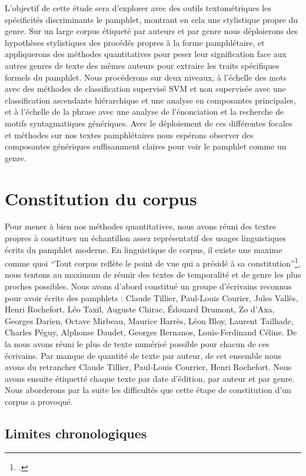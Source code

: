 L'objectif de cette étude sera d'explorer avec des outils textométriques les spécificités discriminants le pamphlet, montrant en cela une stylistique propre du genre. Sur un large corpus étiqueté par auteurs et par genre nous déploierons des hypothèses stylistiques des procédés propres à la forme pamphlétaire, et appliquerons des méthodes quantitatives pour peser leur signification face aux autres genres de texte des mêmes auteurs pour extraire les traits spécifiques formels du pamphlet. Nous procéderons sur deux niveaux, à l'échelle des mots avec des méthodes de classification supervisé SVM et non supervisée avec une classification ascendante hiérarchique et une analyse en composantes principales, et à l'échelle de la phrase avec une analyse de l'énonciation et la recherche de motifs syntagmatiques génériques. Avec le déploiement de ces différentes focales et méthodes sur nos textes pamphlétaires nous espérons observer des composantes génériques suffisamment claires pour voir le pamphlet comme un genre.

\section{Constitution du corpus}

Pour mener à bien nos méthodes quantitatives, nous avons réuni des textes propres à constituer un échantillon assez représentatif des usages linguistiques écrits du pamphlet moderne. En linguistique de corpus, il existe une maxime comme quoi \enquote{Tout corpus reflète le point de vue qui a présidé à sa constitution}\footcites{rastier_malrieu_nodate}, nous tentons au maximum de réunir des textes de temporalité et de genre les plus proches possibles. Nous avons d'abord constitué un groupe d'écrivains reconnus pour avoir écrits des pamphlets : Claude Tillier, Paul-Louis Courier, Jules Vallès, Henri Rochefort, Léo Taxil, Auguste Chirac, Édouard Drumont, Zo d'Axa, Georges Darien, Octave Mirbeau, Maurice Barrès, Léon Bloy, Laurent Tailhade, Charles Péguy, Alphonse Daudet, Georges Bernanos, Louis-Ferdinand Céline. De la nous avons réuni le plus de texte numérisé possible pour chacun de ces écrivains. Par manque de quantité de texte par auteur, de cet ensemble nous avons du retrancher Claude Tillier, Paul-Louis Courrier, Henri Rochefort. Nous avons ensuite étiquetté chaque texte par date d'édition, par auteur et par genre. Nous aborderons par la suite les difficultés que cette étape de constitution d'un corpus a provoqué.

\subsection{Limites chronologiques}

